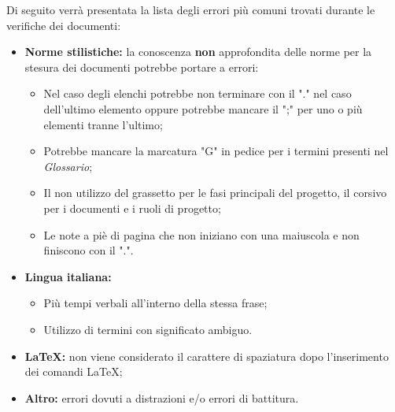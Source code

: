 Di seguito verrà presentata la lista degli errori più comuni trovati durante le verifiche dei documenti:
\begin{itemize}
	\item \textbf{Norme stilistiche:} la conoscenza \textbf{non} approfondita delle norme per la stesura dei documenti potrebbe portare a errori:
		\begin{itemize}
			\item Nel caso degli elenchi potrebbe non terminare con il "." nel caso dell'ultimo elemento oppure potrebbe mancare il ";" per uno o più elementi tranne l'ultimo; 
			\item Potrebbe mancare la marcatura "G" in pedice per i termini presenti nel \textit{Glossario};
			\item Il non utilizzo del grassetto per le fasi principali del progetto, il corsivo per i documenti e i ruoli di progetto;
			\item Le note a piè di pagina che non iniziano con una maiuscola e non finiscono con il ".".
		\end{itemize}
	\item \textbf{Lingua italiana:} 
		\begin{itemize}
			\item Più tempi verbali all'interno della stessa frase;
			\item Utilizzo di termini con significato ambiguo.
		\end{itemize}
	\item \textbf{\LaTeX:} non viene considerato il carattere di spaziatura dopo l'inserimento dei  comandi \LaTeX;
	\item \textbf{Altro:} errori dovuti a distrazioni e/o errori di battitura.
\end{itemize}